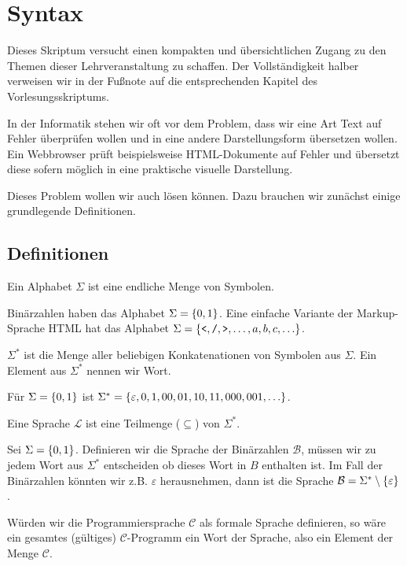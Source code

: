 \chapter{Syntax}
Dieses Skriptum versucht einen kompakten und übersichtlichen Zugang zu den Themen
dieser Lehrveranstaltung zu schaffen. Der Vollständigkeit halber verweisen wir in der Fußnote auf die
entsprechenden Kapitel des Vorlesungsskriptums.

In der Informatik stehen wir oft vor dem Problem, dass wir eine Art Text auf
Fehler überprüfen wollen und in eine andere Darstellungsform übersetzen wollen.
Ein Webbrowser prüft beispielsweise HTML-Dokumente auf Fehler und übersetzt diese
sofern möglich in eine praktische visuelle Darstellung.

Dieses Problem wollen wir auch lösen können. Dazu brauchen wir zunächst einige grundlegende Definitionen.

\section{Definitionen}
\begin{defn}[Alphabet]
Ein Alphabet $\Sigma$ ist eine endliche Menge von Symbolen.
\end{defn}

Binärzahlen haben das Alphabet $\Sigma=\left\{0,1\right\}$.
Eine einfache Variante der Markup-Sprache HTML hat das Alphabet $\Sigma=\left\{\texttt{<},\texttt{/},\texttt{>},\ldots,a,b,c,\ldots\right\}$.

\begin{defn}
$\Sigma^*$ ist die Menge aller beliebigen Konkatenationen von Symbolen aus $\Sigma$.
Ein Element aus $\Sigma^*$ nennen wir Wort.
\end{defn}

Für $\Sigma=\left\{0,1\right\}$ ist $\Sigma^*=\left\{\varepsilon,0,1,00,01,10,11,000,001,\ldots\right\}$.

\begin{defn}[Sprache]
Eine Sprache $\mathcal{L}$ ist eine Teilmenge ($\subseteq$) von $\Sigma^*$.
\end{defn}

Sei $\Sigma=\left\{0,1\right\}$. Definieren wir die Sprache der Binärzahlen $\mathcal{B}$,
müssen wir zu jedem Wort aus $\Sigma^*$ entscheiden ob dieses Wort in $B$ enthalten ist.
Im Fall der Binärzahlen könnten wir z.B. $\varepsilon$ herausnehmen, dann ist die Sprache
$\mathcal{B}=\Sigma^* \setminus \left\{\varepsilon\right\}$.

Würden wir die Programmiersprache $\mathcal{C}$ als formale Sprache definieren, so wäre
ein gesamtes (gültiges) $\mathcal{C}$-Programm ein Wort der Sprache, also ein Element der Menge $\mathcal{C}$.

